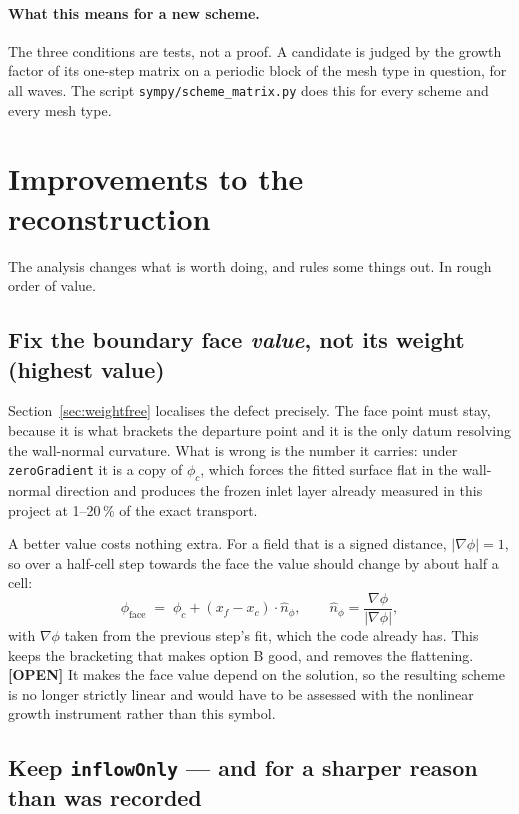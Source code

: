 \documentclass[11pt,a4paper]{article}
\newcommand{\opn}{\textcolor{orange!80!black}{\textbf{[OPEN]}}}
\begin{document}
\paragraph{What this means for a new scheme.}
The three conditions are tests, not a proof. A candidate is judged by the growth factor of
its one-step matrix on a periodic block of the mesh type in question, for all waves. The
script \texttt{sympy/scheme\_matrix.py} does this for every scheme and every mesh type.

\section{Improvements to the reconstruction}
\label{sec:improve}

The analysis changes what is worth doing, and rules some things out. In rough order of value.

\subsection{Fix the boundary face \emph{value}, not its weight (highest value)}

Section~\ref{sec:weightfree} localises the defect precisely. The face point must stay, because
it is what brackets the departure point and it is the only datum resolving the wall-normal
curvature. What is wrong is the number it carries: under \texttt{zeroGradient} it is a copy of
$\phi_c$, which forces the fitted surface flat in the wall-normal direction and produces the
frozen inlet layer already measured in this project at 1--20\,\% of the exact transport.

A better value costs nothing extra. For a field that is a signed distance, $|\nabla\phi| = 1$,
so over a half-cell step towards the face the value should change by about half a cell:
\begin{equation}
  \phi_{\text{face}} \;=\; \phi_c + (x_f - x_c)\cdot \hat{n}_\phi,
  \qquad \hat{n}_\phi = \frac{\nabla\phi}{|\nabla\phi|},
\end{equation}
with $\nabla\phi$ taken from the previous step's fit, which the code already has. This keeps
the bracketing that makes option B good, and removes the flattening. \opn{} It makes the face
value depend on the solution, so the resulting scheme is no longer strictly linear and would
have to be assessed with the nonlinear growth instrument rather than this symbol.

\subsection{Keep \texttt{inflowOnly} --- and for a sharper reason than was recorded}
\end{document}
